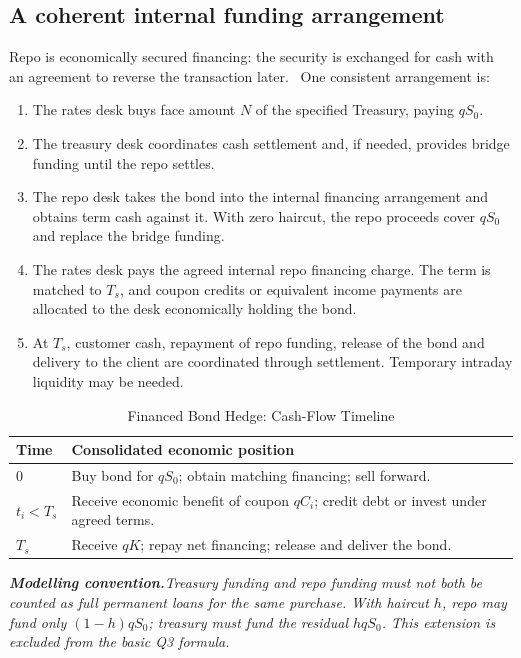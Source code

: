 \documentclass[11pt]{article}
\newcommand{\warningbox}[1]{\par\medskip\noindent\textit{\textbf{Modelling convention.}\enspace #1}\par\medskip}
\numberwithin{equation}{section}
\begin{document}
\subsection{A coherent internal funding arrangement}
Repo is economically secured financing: the security is exchanged for cash with an agreement to reverse the transaction later.~\cite{nyfedrepo}
One consistent arrangement is:
\begin{enumerate}
\item The rates desk buys face amount $N$ of the specified Treasury, paying $qS_0$.
\item The treasury desk coordinates cash settlement and, if needed, provides bridge funding until the repo settles.
\item The repo desk takes the bond into the internal financing arrangement and obtains term cash against it. With zero haircut, the repo proceeds cover $qS_0$ and replace the bridge funding.
\item The rates desk pays the agreed internal repo financing charge. The term is matched to $T_s$, and coupon credits or equivalent income payments are allocated to the desk economically holding the bond.
\item At $T_s$, customer cash, repayment of repo funding, release of the bond and delivery to the client are coordinated through settlement. Temporary intraday liquidity may be needed.
\end{enumerate}

\begin{table}[H]
\centering
\caption{Financed Bond Hedge: Cash-Flow Timeline}
\label{tab:solution-4}
\small
\begin{tabularx}{\textwidth}{@{}L{2.1cm}Y@{}}
\toprule{}\textbf{Time} & \textbf{Consolidated economic position}\\\midrule
$0$ & Buy bond for $qS_0$; obtain matching financing; sell forward.\\
$t_i<T_s$ & Receive economic benefit of coupon $qC_i$; credit debt or invest under agreed terms.\\
$T_s$ & Receive $qK$; repay net financing; release and deliver the bond.\\\bottomrule
\end{tabularx}
\end{table}

\warningbox{Treasury funding and repo funding must not both be counted as full permanent loans for the same purchase. With haircut $h$, repo may fund only $(1-h)qS_0$; treasury must fund the residual $hqS_0$. This extension is excluded from the basic Q3 formula.}
\end{document}
